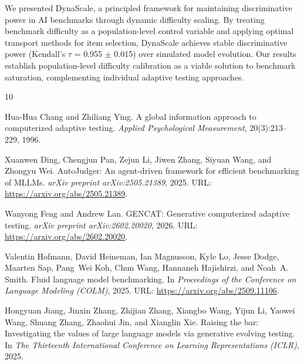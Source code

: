 \documentclass{article}
\begin{document}
We presented DynaScale, a principled framework for maintaining discriminative power in AI benchmarks through dynamic difficulty scaling. By treating benchmark difficulty as a population-level control variable and applying optimal transport methods for item selection, DynaScale achieves stable discriminative power (Kendall's $\tau$ = 0.955 $\pm$ 0.015) over simulated model evolution. Our results establish population-level difficulty calibration as a viable solution to benchmark saturation, complementing individual adaptive testing approaches.




\begin{thebibliography}{10}

Hua-Hua Chang and Zhiliang Ying.
\newblock A global information approach to computerized adaptive testing.
\newblock \emph{Applied Psychological Measurement}, 20(3):213--229, 1996.

Xuanwen Ding, Chengjun Pan, Zejun Li, Jiwen Zhang, Siyuan Wang, and Zhongyu Wei.
\newblock AutoJudger: An agent-driven framework for efficient benchmarking of MLLMs.
\newblock \emph{arXiv preprint arXiv:2505.21389}, 2025.
\newblock URL: \url{https://arxiv.org/abs/2505.21389}.

Wanyong Feng and Andrew Lan.
\newblock GENCAT: Generative computerized adaptive testing.
\newblock \emph{arXiv preprint arXiv:2602.20020}, 2026.
\newblock URL: \url{https://arxiv.org/abs/2602.20020}.

Valentin Hofmann, David Heineman, Ian Magnusson, Kyle Lo, Jesse Dodge, Maarten
  Sap, Pang~Wei Koh, Chun Wang, Hannaneh Hajishirzi, and Noah~A. Smith.
\newblock Fluid language model benchmarking.
\newblock In \emph{Proceedings of the Conference on Language Modeling (COLM)},
  2025.
\newblock URL: \url{https://arxiv.org/abs/2509.11106}.

Hongyuan Jiang, Jinxin Zhang, Zhijian Zhang, Xiangbo Wang, Yijun Li, Yaowei
  Wang, Shuang Zhang, Zhaohui Jin, and Xianglin Xie.
\newblock Raising the bar: Investigating the values of large language models
  via generative evolving testing.
\newblock In \emph{The Thirteenth International Conference on Learning
  Representations (ICLR)}, 2025.


\end{thebibliography}
\end{document}
